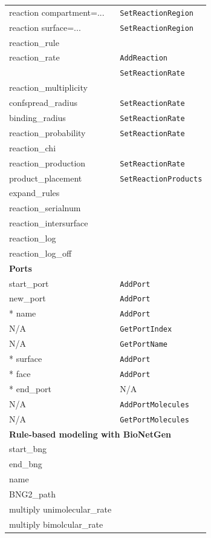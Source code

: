 \documentclass {scrbook}
\newcommand {\ttt} {\texttt}
\begin{document}
\begin{longtable}[c]{ll}
reaction compartment=... & \ttt{SetReactionRegion}\\
reaction surface=... & \ttt{SetReactionRegion}\\
reaction\_rule \\ %
reaction\_rate & \ttt{AddReaction}\\
& \ttt{SetReactionRate}\\
reaction\_multiplicity \\ %
confspread\_radius & \ttt{SetReactionRate}\\
binding\_radius & \ttt{SetReactionRate}\\
reaction\_probability & \ttt{SetReactionRate}\\
reaction\_chi \\ %
reaction\_production & \ttt{SetReactionRate}\\
product\_placement & \ttt{SetReactionProducts}\\
expand\_rules \\ %
reaction\_serialnum \\ %
reaction\_intersurface \\ %
reaction\_log \\ %
reaction\_log\_off \\ %
\hline
\multicolumn{2}{l}{\hspace{0.3in}\textbf{Ports}}\\
\hline
start\_port & \ttt{AddPort}\\
new\_port & \ttt{AddPort}\\
{*} name & \ttt{AddPort}\\
N/A & \ttt{GetPortIndex}\\
N/A & \ttt{GetPortName}\\
{*} surface & \ttt{AddPort}\\
{*} face & \ttt{AddPort}\\
{*} end\_port & N/A\\
N/A & \ttt{AddPortMolecules}\\
N/A & \ttt{GetPortMolecules}\\
\hline
\multicolumn{2}{l}{\hspace{0.3in}\textbf{Rule-based modeling with BioNetGen}}\\
\hline
start\_bng \\ %
end\_bng \\ %
name \\ %
BNG2\_path \\ %
multiply unimolecular\_rate \\ %
multiply bimolcular\_rate \\ %

\end{longtable}
\end{document}
